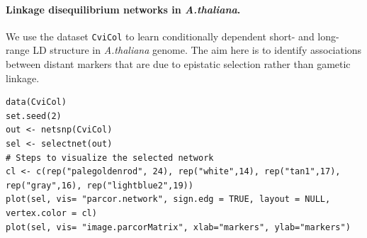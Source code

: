\paragraph{Linkage disequilibrium networks in \emph{A.thaliana}.} We use the dataset {\tt CviCol} to learn conditionally dependent short- and long-range LD structure in \emph{A.thaliana} genome. The aim here is to identify associations between distant markers that are due to epistatic selection rather than gametic linkage.

\begin{verbatim}
data(CviCol)
set.seed(2)
out <- netsnp(CviCol)
sel <- selectnet(out)
# Steps to visualize the selected network
cl <- c(rep("palegoldenrod", 24), rep("white",14), rep("tan1",17), 
rep("gray",16), rep("lightblue2",19))
plot(sel, vis= "parcor.network", sign.edg = TRUE, layout = NULL, vertex.color = cl)
plot(sel, vis= "image.parcorMatrix", xlab="markers", ylab="markers")
\end{verbatim}


